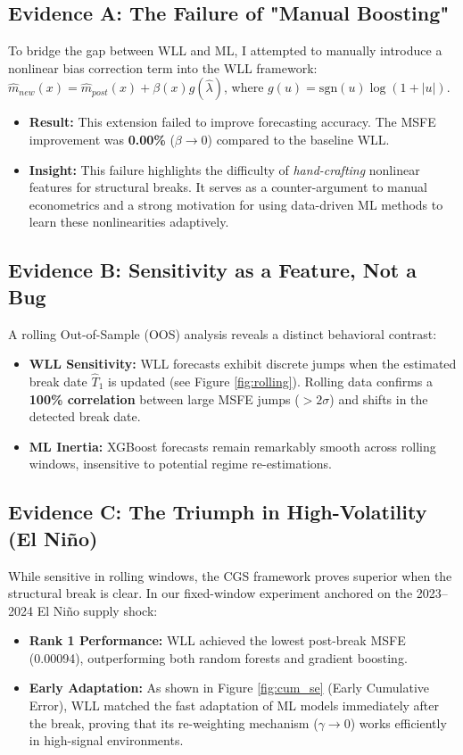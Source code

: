 \documentclass[11pt, a4paper]{article}
\begin{document}
\subsection{Evidence A: The Failure of "Manual Boosting"}
To bridge the gap between WLL and ML, I attempted to manually introduce a nonlinear bias correction term into the WLL framework: $\hat{m}_{new}(x) = \hat{m}_{post}(x) + \beta(x) g(\hat{\lambda})$, where $g(u) = \text{sgn}(u)\log(1+|u|)$.
\begin{itemize}[leftmargin=*]
    \item \textbf{Result:} This extension failed to improve forecasting accuracy. The MSFE improvement was \textbf{0.00\%} ($\beta \to 0$) compared to the baseline WLL.
    \item \textbf{Insight:} This failure highlights the difficulty of \textit{hand-crafting} nonlinear features for structural breaks. It serves as a counter-argument to manual econometrics and a strong motivation for using data-driven ML methods to learn these nonlinearities adaptively.
\end{itemize}

\subsection{Evidence B: Sensitivity as a Feature, Not a Bug}
A rolling Out-of-Sample (OOS) analysis reveals a distinct behavioral contrast:
\begin{itemize}[leftmargin=*]
    \item \textbf{WLL Sensitivity:} WLL forecasts exhibit discrete jumps when the estimated break date $\hat{T}_1$ is updated (see Figure \ref{fig:rolling}). Rolling data confirms a \textbf{100\% correlation} between large MSFE jumps ($>2 \sigma$) and shifts in the detected break date.
    \item \textbf{ML Inertia:} XGBoost forecasts remain remarkably smooth across rolling windows, insensitive to potential regime re-estimations.
\end{itemize}

\subsection{Evidence C: The Triumph in High-Volatility (El Ni\~no)}
While sensitive in rolling windows, the CGS framework proves superior when the structural break is clear. In our fixed-window experiment anchored on the 2023--2024 El Ni\~no supply shock:
\begin{itemize}[leftmargin=*]
    \item \textbf{Rank 1 Performance:} WLL achieved the lowest post-break MSFE (0.00094), outperforming both random forests and gradient boosting.
    \item \textbf{Early Adaptation:} As shown in Figure \ref{fig:cum_se} (Early Cumulative Error), WLL matched the fast adaptation of ML models immediately after the break, proving that its re-weighting mechanism ($\gamma \to 0$) works efficiently in high-signal environments.
\end{itemize}
\end{document}
